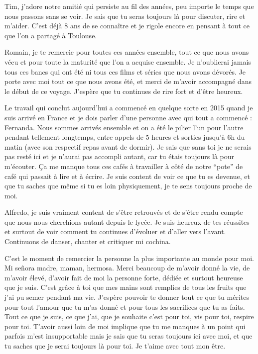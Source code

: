 Tim, j’adore notre amitié qui persiste au fil des années, peu importe le temps que nous passons sans se voir. Je sais que tu seras toujours là pour discuter, rire et m’aider. C’est déjà 8 ans de se connaître et je rigole encore en pensant à tout ce que l’on a partagé à Toulouse.

Romain, je te remercie pour toutes ces années ensemble, tout ce que nous avons vécu et pour toute la maturité que l’on a acquise ensemble. Je n’oublierai jamais tous ces bancs qui ont été ni tous ces films et séries que nous avons dévorés. Je porte avec moi tout ce que nous avons été, et merci de m’avoir accompagné dans le début de ce voyage. J’espère que tu continues de rire fort et d’être heureux.

Le travail qui conclut aujourd’hui a commencé en quelque sorte en 2015 quand je suis arrivé en France et je dois parler d’une personne avec qui tout a commencé : Fernanda. Nous sommes arrivés ensemble et on a été le pilier l’un pour l’autre pendant tellement longtemps, entre appels de 5 heures et sorties jusqu’à 6h du matin (avec son respectif repas avant de dormir). Je sais que sans toi je ne serais pas resté ici et je n’aurai pas accompli autant, car tu étais toujours là pour m’écouter. Ça me manque tous ces cafés à travailler à côté de notre “pote” de café qui passait à lire et à écrire. Je suis content de voir ce que tu es devenue, et que tu saches que même si tu es loin physiquement, je te sens toujours proche de moi.

Alfredo, je suis vraiment content de s’être retrouvés et de s’être rendu compte que nous nous cherchions autant depuis le lycée. Je suis heureux de tes réussites et surtout de voir comment tu continues d’évoluer et d’aller vers l’avant. Continuons de danser, chanter et critiquer mi cochina.

\vspace{5mm}
C’est le moment de remercier la personne la plus importante au monde pour moi. Mi señora madre, maman, hermosa. Merci beaucoup de m’avoir donné la vie, de m’avoir élevé, d’avoir fait de moi la personne forte, dédiée et surtout heureuse que je suis. C’est grâce à toi que mes mains sont remplies de tous les fruits que j’ai pu semer pendant ma vie. J’espère pouvoir te donner tout ce que tu mérites pour tout l’amour que tu m’as donné et pour tous les sacrifices que tu as faits. Tout ce que je suis, ce que j’ai, que je souhaite c’est pour toi, vis pour toi, respire pour toi. T’avoir aussi loin de moi implique que tu me manques à un point qui parfois m’est insupportable mais je sais que tu seras toujours ici avec moi, et que tu saches que je serai toujours là pour toi. Je t’aime avec tout mon être.

